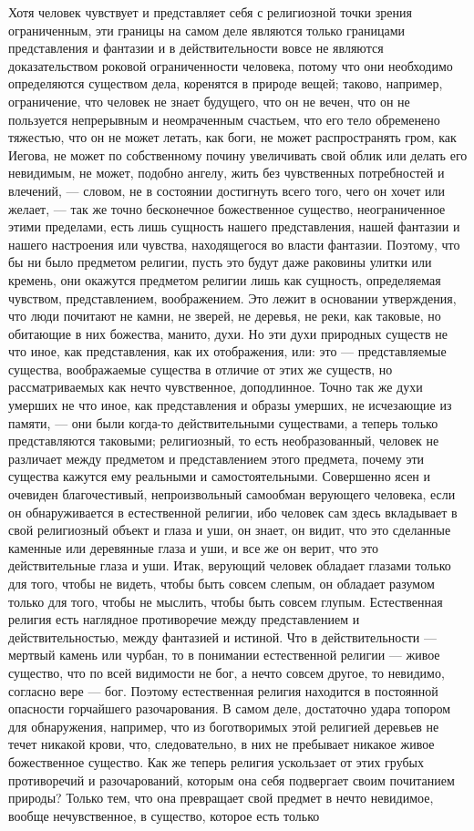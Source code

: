 \documentclass[12pt,oneside]{book}
\begin{document}
Хотя человек чувствует и представляет себя с религиозной точки зрения ограниченным, эти границы на самом деле являются только границами представления и фантазии и в действительности вовсе не являются доказательством роковой ограниченности человека, потому что они необходимо определяются существом дела, коренятся в природе вещей; таково, например, ограничение, что человек не знает будущего, что он не вечен, что он не пользуется непрерывным и неомраченным счастьем, что его тело обременено тяжестью, что он не может летать, как боги, не может распространять гром, как Иегова, не может по собственному почину увеличивать свой облик или делать его невидимым, не может, подобно ангелу, жить без чувственных потребностей и влечений, --- словом, не в состоянии достигнуть всего того, чего он хочет или желает, --- так же точно бесконечное божественное существо, неограниченное этими пределами, есть лишь сущность нашего представления, нашей фантазии и нашего настроения или чувства, находящегося во власти фантазии. Поэтому, что бы ни было предметом религии, пусть это будут даже раковины улитки или кремень, они окажутся предметом религии лишь как сущность, определяемая чувством, представлением, воображением. Это лежит в основании утверждения, что люди почитают не камни, не зверей, не деревья, не реки, как таковые, но обитающие в них божества, манито, духи. Но эти духи природных существ не что иное, как представления, как их отображения, или: это --- представляемые существа, воображаемые существа в отличие от этих же существ, но рассматриваемых как нечто чувственное, доподлинное. Точно так же духи умерших не что иное, как представления и образы умерших, не исчезающие из памяти, --- они были когда-то действительными существами, а теперь только представляются таковыми; религиозный, то есть необразованный, человек не различает между предметом и представлением этого предмета, почему эти существа кажутся ему реальными и самостоятельными. Совершенно ясен и очевиден благочестивый, непроизвольный самообман верующего человека, если он обнаруживается в естественной религии, ибо человек сам здесь вкладывает в свой религиозный объект и глаза и уши, он знает, он видит, что это сделанные каменные или деревянные глаза и уши, и все же он верит, что это действительные глаза и уши. Итак, верующий человек обладает глазами только для того, чтобы не видеть, чтобы быть совсем слепым, он обладает разумом только для того, чтобы не мыслить, чтобы быть совсем глупым. Естественная религия есть наглядное противоречие между представлением и действительностью, между фантазией и истиной. Что в действительности --- мертвый камень или чурбан, то в понимании естественной религии --- живое существо, что по всей видимости не бог, а нечто совсем другое, то невидимо, согласно вере --- бог. Поэтому естественная религия находится в постоянной опасности горчайшего разочарования. В самом деле, достаточно удара топором для обнаружения, например, что из боготворимых этой религией деревьев не течет никакой крови, что, следовательно, в них не пребывает никакое живое божественное существо. Как же теперь религия ускользает от этих грубых противоречий и разочарований, которым она себя подвергает своим почитанием природы? Только тем, что она превращает свой предмет в нечто невидимое, вообще нечувственное, в существо, которое есть только 
\end{document}
